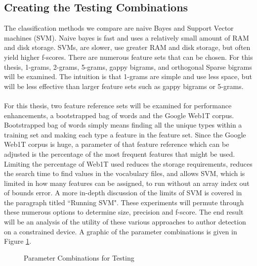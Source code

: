 	\subsection{Creating the Testing Combinations} The classification methods we compare are naive Bayes and Support Vector machines (SVM). Naive bayes is fast and uses a relatively small amount of RAM and disk storage. SVMs, are slower, use greater RAM and disk storage, but often yield higher f-scores.  There are numerous feature sets that can be chosen.  For this thesis, 1-grams, 2-grams, 5-grams, gappy bigrams, and orthogonal Sparse bigrams will be examined.  The intuition is that 1-grams are simple and use less space, but will be less effective than larger feature sets such as gappy bigrams or 5-grams.
	\paragraph{} For this thesis, two feature reference sets will be examined for performance enhancements, a bootstrapped bag of words and the Google Web1T corpus.  Bootstrapped bag of words simply means finding all the unique types within a training set and making each type a feature in the feature set. Since the Google Web1T corpus is huge, a parameter of that feature reference which can be adjusted is the percentage of the most frequent features that might be used.  Limiting the percentage of Web1T used reduces the storage requirements, reduces the search time to find values in the vocabulary files, and allows SVM, which is limited in how many features can be assigned, to run without an array index out of bounds error.  A more in-depth discussion of the limits of SVM is covered in the paragraph titled ``Running SVM". These experiments will permute through these numerous options to determine size, precision and f-score.  The end result will be an analysis of the utility of these various approaches to author detection on a constrained device.  A graphic of the parameter combinations is given in Figure \ref{fig:parameterCombinations}.   
	
	\begin{figure}[ht!]
		\begin{center}
			\caption{Parameter Combinations for Testing}
			\label{fig:parameterCombinations}
		\end{center}
	\end{figure}
	
